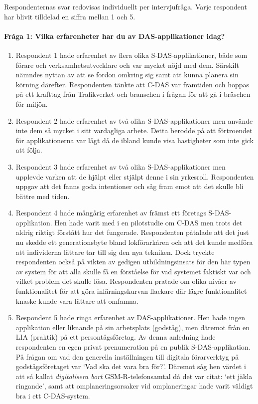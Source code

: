 Respondenternas svar redovisas individuellt per intervjufråga.
Varje respondent har blivit tilldelad en siffra mellan 1 och 5.
\paragraph{Fråga 1: Vilka erfarenheter har du av DAS-applikationer idag?}
\begin{enumerate}
    \item Respondent 1 hade erfarenhet av flera olika S-DAS-applikationer, både som förare och verksamhetsutvecklare och var mycket nöjd med dem.
    Särskilt nämndes nyttan av att se fordon omkring sig samt att kunna planera sin körning därefter.
    Respondenten tänkte att C-DAS var framtiden och hoppas på ett krafttag från Trafikverket och branschen i frågan för att gå i bräschen för miljön.
    \item Respondent 2 hade erfarenhet av två olika S-DAS-applikationer men använde inte dem så mycket i sitt vardagliga arbete.
    Detta berodde på att förtroendet för applikationerna var lågt då de ibland kunde visa hastigheter som inte gick att följa.
    \item Respondent 3 hade erfarenhet av två olika S-DAS-applikationer men upplevde varken att de hjälpt eller stjälpt denne i sin yrkesroll.
    Respondenten uppgav att det fanns goda intentioner och såg fram emot att det skulle bli bättre med tiden.
    \item Respondent 4 hade mångårig erfarenhet av främst ett företags S-DAS-applikation.
    Hen hade varit med i en pilotstudie om C-DAS men trots det aldrig riktigt förstått hur det fungerade.
    Respondenten påtalade att det just nu skedde ett generationsbyte bland lokförarkåren och att det kunde medföra att individerna lättare tar till sig den nya tekniken.
    Dock tryckte respondenten också på vikten av gedigen utbildningsinsats för den här typen av system för att alla skulle få en förståelse för vad systemet faktiskt var och vilket problem det skulle lösa.
    Respondenten pratade om olika nivåer av funktionalitet för att göra inlärningskurvan flackare där lägre funktionalitet knaske kunde vara lättare att omfamna.
    \item Respondent 5 hade ringa erfarenhet av DAS-applikationer.
    Hen hade ingen applikation eller liknande på sin arbetsplats (godståg), men däremot från en LIA (praktik) på ett persontågsföretag.
    Av denna anledning hade respondenten en egen privat prenumeration på en publik S-DAS-applikation.
    På frågan om vad den generella inställningen till digitala förarverktyg på godstågsföretaget var \lq{}Vad ska det vara bra för?\rq{}.
    Däremot såg hen värdet i att så kallat \emph{digitalisera bort} GSM-R-telefonsamtal då det var citat: \lq{}ett jäkla ringande\rq{}, samt att omplaneringsorsaker vid omplaneringar hade varit väldigt bra i ett C-DAS-system.
\end{enumerate}

